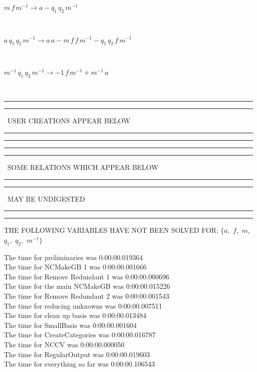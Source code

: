 \documentclass[rep10,leqno]{report}
\begin{document}
\begin{minipage}{6in}
$
m\,
 f\,
 m^{ -1 }\rightarrow a - q_{1}\,
 q_{2}\,
 m^{ -1 }
$
\end{minipage}\medskip \\
\begin{minipage}{6in}
$
a\,
 q_{1}\,
 q_{2}\,
 m^{ -1 }\rightarrow a\,
 a - m\,
 f\,
 f\,
 m^{ -1 } - q_{1}\,
 q_{2}\,
 f\,
 m^{ -1 }
$
\end{minipage}\medskip \\
\begin{minipage}{6in}
$
m^{ -1 }\,
 q_{1}\,
 q_{2}\,
 m^{ -1 }\rightarrow -1\,
 f\,
 m^{ -1 } + m^{ -1 }\,
 a
$
\end{minipage}\\
\rule[2pt]{6in}{1pt}\hfil\break
\rule[2.5pt]{1.701in}{1pt}
\ USER CREATIONS APPEAR BELOW\ 
\rule[2.5pt]{1.701in}{1pt}\hfil\break
\rule[2pt]{6in}{1pt}\hfil\break
\rule[2pt]{6in}{4pt}\hfil\break
\rule[2pt]{1.45in}{4pt}
\ SOME RELATIONS WHICH APPEAR BELOW\ 
\rule[2pt]{1.45in}{4pt}\hfil\break
\rule[2pt]{2.18in}{4pt}
\ MAY BE UNDIGESTED\ 
\rule[2pt]{2.18in}{4pt}\hfil\break
\rule[2pt]{6in}{4pt}\hfil\break
THE FOLLOWING VARIABLES HAVE NOT BEEN SOLVED FOR:\hfil\break
$\{a,
$ $
f,
$ $
m,
$ $
q_{1},
$ $
q_{2},
$ $
m^{ -1 }\}$
\smallskip\\
\vspace{10pt}

\noindent
The time for preliminaries was 0:00:00.019364\\
The time for NCMakeGB 1 was 0:00:00.001666\\
The time for Remove Redundant 1 was 0:00:00.000696\\
The time for the main NCMakeGB was 0:00:00.015226\\
The time for Remove Redundant 2 was 0:00:00.001543\\
The time for reducing unknowns was 0:00:00.007511\\
The time for clean up basis was 0:00:00.013484\\
The time for SmallBasis was 0:00:00.001604\\
The time for CreateCategories was 0:00:00.016787\\
The time for NCCV was 0:00:00.000050\\
The time for RegularOutput was 0:00:00.019603\\
The time for everything so far was 0:00:00.106543\\
\end{document}
